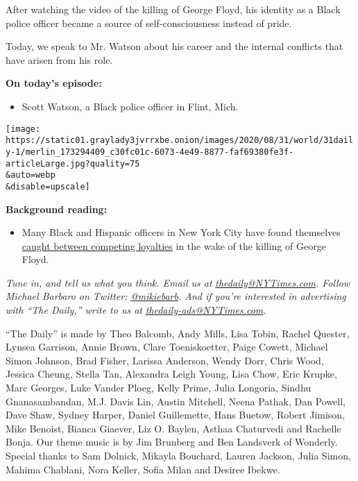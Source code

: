 After watching the video of the killing of George Floyd, his identity as
a Black police officer became a source of self-consciousness instead of
pride.

Today, we speak to Mr. Watson about his career and the internal
conflicts that have arisen from his role.

\textbf{On today's episode:}

\begin{itemize}
\tightlist
\item
  Scott Watson, a Black police officer in Flint, Mich.
\end{itemize}

\texttt{[image: https://static01.graylady3jvrrxbe.onion/images/2020/08/31/world/31daily-1/merlin\_173294409\_c30fc01c-6073-4e49-8877-faf69380fe3f-articleLarge.jpg?quality=75\\\&auto=webp\\\&disable=upscale]}

\textbf{Background reading:}

\begin{itemize}
\tightlist
\item
  Many Black and Hispanic officers in New York City have found
  themselves
  \href{https://www.nytimes3xbfgragh.onion/2020/06/17/nyregion/black-hispanic-officers-nypd-protests.html?searchResultPosition=2}{caught
  between competing loyalties} in the wake of the killing of George
  Floyd.
\end{itemize}

\emph{Tune in, and tell us what you think. Email us at}
\href{mailto:thedaily@NYTimes.com}{\emph{thedaily@NYTimes.com}}\emph{.
Follow Michael Barbaro on Twitter:}
\href{https://twitter.com/mikiebarb}{\emph{@mikiebarb}}\emph{. And if
you're interested in advertising with ``The Daily,'' write to us at}
\href{mailto:thedaily-ads@NYTimes.com}{\emph{thedaily-ads@NYTimes.com}}\emph{.}

``The Daily'' is made by Theo Balcomb, Andy Mills, Lisa Tobin, Rachel
Quester, Lynsea Garrison, Annie Brown, Clare Toeniskoetter, Paige
Cowett, Michael Simon Johnson, Brad Fisher, Larissa Anderson, Wendy
Dorr, Chris Wood, Jessica Cheung, Stella Tan, Alexandra Leigh Young,
Lisa Chow, Eric Krupke, Marc Georges, Luke Vander Ploeg, Kelly Prime,
Julia Longoria, Sindhu Gnanasambandan, M.J. Davis Lin, Austin Mitchell,
Neena Pathak, Dan Powell, Dave Shaw, Sydney Harper, Daniel Guillemette,
Hans Buetow, Robert Jimison, Mike Benoist, Bianca Giaever, Liz O.
Baylen, Asthaa Chaturvedi and Rachelle Bonja. Our theme music is by Jim
Brunberg and Ben Landsverk of Wonderly. Special thanks to Sam Dolnick,
Mikayla Bouchard, Lauren Jackson, Julia Simon, Mahima Chablani, Nora
Keller, Sofia Milan and Desiree Ibekwe.

